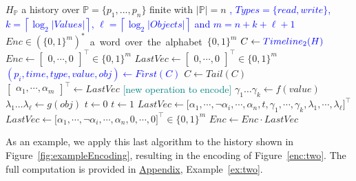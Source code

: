 \documentclass[12pt]{article}
\begin{document}
\begin{algorithm}[H]
\caption{Basic Timeline+TypesValuesObjects}\label{alg:basicTimelineTypesValues}
\begin{algorithmic}[1]
\Require $H_\mathbb{P}$ a history over \mbox{$\mathbb{P}=\{p_1,...,p_n\}$} finite with $|\mathbb{P}|=n$ \textcolor{blue}{, $Types=\{read,write\}$, \mbox{$k=\left\lceil \log_2 |Values| \right\rceil$}, \mbox{$\ell=\left\lceil \log_2 |Objects| \right\rceil$} and \mbox{$m=n+k+\ell+1$}}
\Ensure \mbox{$Enc\in(\{0,1\}^m)^*$ a word over the alphabet $\{0,1\}^m$}
\State $C \gets \textcolor{blue}{Timeline_2(H)}$
\State $Enc \gets \begin{bmatrix} 0 , \cdots , 0 \end{bmatrix}^\top\in \{0,1\}^m $
\State $LastVec\gets \begin{bmatrix} 0 , \cdots , 0 \end{bmatrix}^\top\in \{0,1\}^m$
	\State \textcolor{blue}{$(p_i,time,type,value,obj)\gets First(C)$}
	\State $C\gets Tail(C)$	
	\State $\begin{bmatrix}\alpha_1 , \cdots  , \alpha_m\end{bmatrix}^\top \gets LastVec$
	\color{purple}
	  \textcolor{teal}{[new operation to encode]}
		\State $\gamma_1\hdots\gamma_k\gets f(value)$
		\State $\lambda_1\hdots\lambda_\ell\gets g(obj)$
			\State $t\gets 0$
		\Else
			\State $t\gets 1$
		\EndIf
		\State $LastVec\gets\big[\alpha_1 , \cdots , \neg\alpha_i ,\cdots ,\alpha_n  ,t,\gamma_1 ,\cdots  ,\gamma_k,\lambda_1,\cdots,\lambda_\ell\big]^\top$
	\Else
		\color{black}
		\State $LastVec\gets\big[\alpha_1, \cdots , \neg\alpha_i , \cdots , \alpha_n,0,\cdots,0\big]^\top\in\{0,1\}^m$
	\color{purple}	
	\EndIf
	\color{black}
	\State $Enc\gets Enc\cdot LastVec$
\EndWhile
\end{algorithmic}
\end{algorithm}

As an example, we apply this last algorithm to the history shown in Figure~\ref{fig:exampleEncoding}, resulting in the encoding of Figure~\ref{enc:two}. The full computation is provided in \hyperref[sec:appendix]{Appendix}, Example~\ref{ex:two}.
\end{document}
